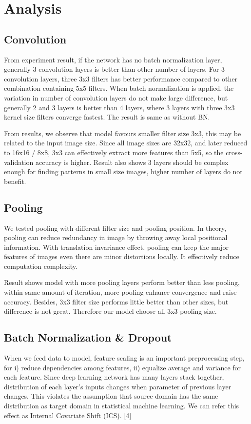 \documentclass[journal,onecolumn]{IEEEtran}
\begin{document}
\section{Analysis}
\subsection{Convolution}
From experiment result, if the network has no batch normalization layer, generally 3 convolution layers is better than other number of layers. For 3 convolution layers, three 3x3 filters has better performance compared to other combination containing 5x5 filters. When batch normalization is applied, the variation in number of convolution layers do not make large difference, but generally 2 and 3 layers is better than 4 layers, where 3 layers with three 3x3 kernel size filters converge fastest. The result is same as without BN. 

From results, we observe that model favours smaller filter size 3x3, this may be related to the input image size. Since all image sizes are 32x32, and later reduced to 16x16 / 8x8, 3x3 can effectively extract more features than 5x5, so the cross-validation accuracy is higher. Result also shows 3 layers should be complex enough for finding patterns in small size images, higher number of layers do not benefit.

\subsection{Pooling}
We tested pooling with different filter size and pooling position. In theory, pooling can reduce redundancy in image by throwing away local positional information. With translation invariance effect, pooling can keep the major features of images even there are minor distortions locally. It effectively reduce computation complexity.

Result shows model with more pooling layers perform better than less pooling, within same amount of iteration, more pooling enhance convergence and raise accuracy. Besides, 3x3 filter size performs little better than other sizes, but difference is not great. Therefore our model choose all 3x3 pooling size.


\subsection{Batch Normalization \& Dropout}
When we feed data to model, feature scaling is an important preprocessing step, for i) reduce dependencies among features, ii) equalize average and variance for each feature. Since deep learning network has many layers stack together, distribution of each layer’s inputs changes when parameter of previous layer changes. This violates the assumption that source domain has the same distribution as target domain in statistical machine learning. We can refer this effect as Internal Covariate Shift (ICS). [4]
\end{document}
